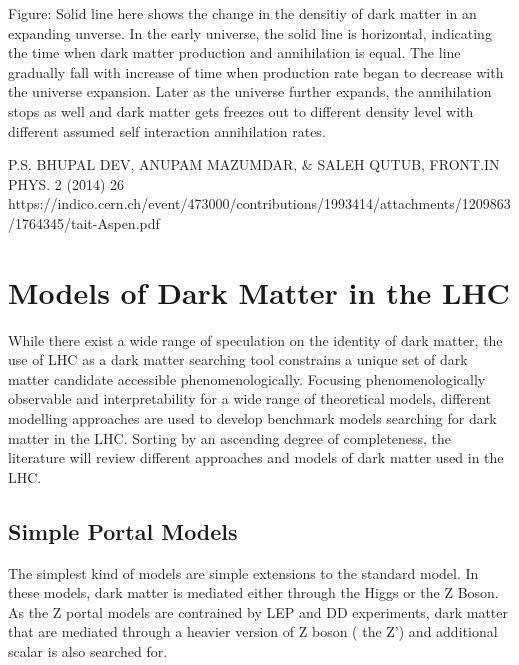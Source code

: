Figure: Solid line here shows the change in the densitiy of dark matter in an expanding unverse. In the early universe, the solid line is horizontal, indicating the time when dark matter production and annihilation is equal. The line gradually fall with increase of time when production rate began to decrease with the universe expansion. Later as the universe further expands, the annihilation stops as well and dark matter gets freezes out to different density level with different assumed
self interaction annihilation rates.

P.S. BHUPAL DEV, ANUPAM MAZUMDAR, & SALEH QUTUB, FRONT.IN PHYS. 2 (2014) 26
https://indico.cern.ch/event/473000/contributions/1993414/attachments/1209863/1764345/tait-Aspen.pdf


\section{Models of Dark Matter in the LHC}

While there exist a wide range of speculation on the identity of dark matter, the use of LHC as a dark matter searching tool constrains a unique set of dark matter candidate accessible phenomenologically. 
Focusing phenomenologically observable and interpretability for a wide range of theoretical models, different modelling approaches are used to develop benchmark models searching for dark matter in the LHC.
Sorting by an ascending degree of completeness, the literature will review different approaches and models of dark matter used in the LHC.

\subsection{Simple Portal Models}
The simplest kind of models are simple extensions to the standard model. In these models, dark matter is mediated either through the Higgs or the Z Boson. As the Z portal models are contrained by LEP and DD experiments, dark matter that are mediated through a heavier version of Z boson ( the Z') and additional scalar is also searched for. 

